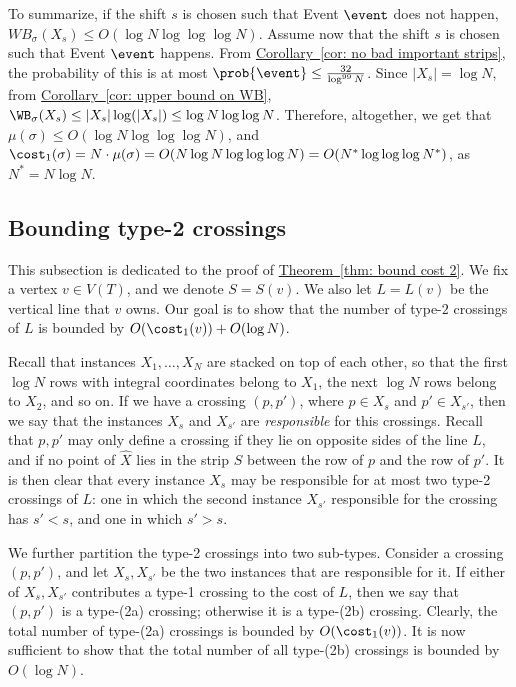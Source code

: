 \documentclass[11pt]{article}
\numberwithin{equation}{section}
\theoremstyle{definition}
\theoremstyle{plain}
\newcommand{\expref}[2]{\hyperref[#2]{#1~\ref{#2}}}
\begin{document}
To summarize, if the shift $s$ is chosen such that Event $\event$ does not happen,  	 $WB_{\sigma}(X_s)\leq O(\log N \log\log\log N)$. Assume now that the shift $s$ is chosen such that Event $\event$ happens. From \expref{Corollary}{cor: no bad important strips}, the probability of this is at most 	 $\prob{\event}\leq \frac{32}{\log^{99}N}$. Since $|X_s|=\log N$, from \expref{Corollary}{cor: upper bound on WB}, $\WB_{\sigma}(X_s)\leq |X_s|\log(|X_s|)\leq \log N\log\log N$. Therefore, altogether, we get that $\mu(\sigma)\leq O(\log N\log\log\log N)$, and $\cost_1(\sigma)=N\cdot \mu(\sigma)=O(N\log N\log\log\log N)=O(N^*\log\log\log N^*)$, as $N^*=N\log N$.


%
%
%
\subsection{Bounding type-2 crossings}\label{subsec:type-2} 
%
%
%

This subsection is dedicated to the proof of \expref{Theorem}{thm: bound cost 2}. We fix a vertex $v\in V(T)$, and we denote $S=S(v)$. We also let $L = L(v)$ be the vertical line that $v$ owns. 
Our goal is to show that the number of type-$2$ crossings of $L$ is bounded by $O(\cost_1(v))+O(\log N)$.

Recall that instances $X_1,\ldots,X_N$ are stacked on top of each other, so that the first $\log N$ rows with integral coordinates  belong to $X_1$, the next $\log N$ rows belong to $X_2$, and so on. If we have a crossing $(p,p')$, where $p\in X_s$ and $p'\in X_{s'}$, then we say that the instances $X_s$ and $X_{s'}$ are \emph{responsible} for this crossings. Recall that $p,p'$ may only define a crossing if they lie on opposite sides of the line $L$, and if no point of $\hat X$ lies in the strip $S$ between the row of $p$ and the row of $p'$. It is then clear that every instance $X_s$ may be responsible for at most two type-2 crossings of $L$: one in which the second instance $X_{s'}$ responsible for the crossing has $s'<s$, and one in which $s'>s$.

We further partition the type-2 crossings into two sub-types. Consider a crossing $(p,p')$, and let $X_s,X_{s'}$ be the two instances that are responsible for it. If either of $X_s,X_{s'}$ contributes a type-1 crossing to the cost of $L$, then we say that $(p,p')$ is a type-(2a) crossing; otherwise it is a type-(2b) crossing. Clearly, the total number of type-(2a) crossings is bounded by $O(\cost_1(v))$. It is now sufficient to show that the total number of all type-(2b) crossings is bounded by $O(\log N)$.
\end{document}
